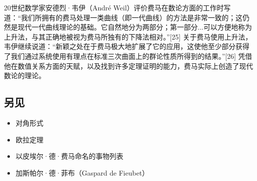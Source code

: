 20世纪数学家安德烈·韦伊（André Weil）评价费马在数论方面的工作时写道：“我们所拥有的费马处理一类曲线（即一代曲线）的方法是非常一致的；这仍然是现代一代曲线理论的基础。它自然地分为两部分；第一部分...可以方便地称为上升法，与其正确地被视为费马所独有的下降法相对。”[25] 关于费马使用上升法，韦伊继续说道：“新颖之处在于费马极大地扩展了它的应用，这使他至少部分获得了我们通过系统使用有理点在标准三次曲面上的群论性质所得到的结果。”[26] 凭借他在数值关系方面的天赋，以及找到许多定理证明的能力，费马实际上创造了现代数论的理论。
\subsection{另见}  
\begin{itemize}
\item 对角形式  
\item 欧拉定理  
\item 以皮埃尔·德·费马命名的事物列表  
\item 加斯帕尔·德·菲布（Gaspard de Fieubet）
\end{itemize}
